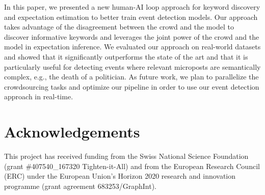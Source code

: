 \documentclass[letterpaper]{article}
\begin{document}
In this paper, we presented a new human-AI loop approach for keyword discovery and expectation estimation to better train event detection models. Our approach takes advantage of the disagreement between the crowd and the model to discover informative keywords and leverages the joint power of the crowd and the model in expectation inference. We evaluated our approach on real-world datasets and showed that it significantly outperforms the state of the art and that it is particularly useful for detecting events where relevant microposts are semantically complex, e.g., the death of a politician. As future work, we plan to parallelize the crowdsourcing tasks and optimize our pipeline in order to use our event detection approach in real-time.

\section{Acknowledgements}
This project has received funding from the Swiss National Science Foundation (grant \#407540\_167320 Tighten-it-All) and from the European Research Council (ERC) under the European Union's Horizon 2020 research and innovation programme (grant agreement 683253/GraphInt).

\begin{quote}


\end{quote}
\end{document}
